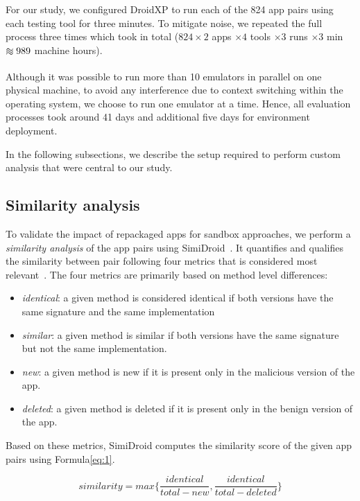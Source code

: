 For our study, we configured DroidXP to run each of the 824 app pairs using each testing tool for three minutes. To mitigate noise, we repeated the full process three times which took in total ($824 \times 2$ apps $\times 4$ tools $\times 3$ runs $\times 3$ min $\apeq 989$ machine hours).

Although it was possible to run more than 10 emulators in parallel on one physical machine, to avoid any interference due to context switching within the operating system, we choose to run one emulator at a time. Hence, all evaluation processes took around 41 days and additional five days for environment deployment.

In the following subsections, we describe the setup required to perform custom analysis that were central to our study. 
\subsection{Similarity analysis}

To validate the impact of repackaged apps for sandbox approaches, we perform a \textit{similarity analysis} of the app pairs using SimiDroid~\cite{DBLP:conf/trustcom/0029BK17}. It quantifies and qualifies the similarity between pair following four metrics that is considered most relevant~\cite{DBLP:conf/wcre/0029BKT16}. The four metrics are primarily based on method level differences:

\begin{itemize}
    \item \textit{identical}: a given method is considered identical if both versions have the same signature and the same implementation
    \item \textit{similar}: a given method is similar if both versions have the same signature but not the same implementation.
    \item \textit{new}: a given method is new if it is present only in the malicious version of the app.
    \item \textit{deleted}: a given method is deleted if it is present only in the benign version of the app.
\end{itemize}

Based on these metrics, SimiDroid computes the similarity score of the given app pairs using Formula\eqref{eq:1}.

\begin{equation}
 similarity = max \lbrace\frac{identical}{total-new},\frac{identical}{total-deleted}\rbrace  \label{eq:1}
\end{equation}

